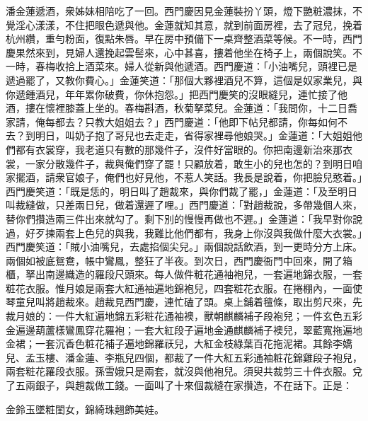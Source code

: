 潘金蓮遞酒，衆姊妹相陪吃了一回。西門慶因見金蓮裝扮丫頭，燈下艷粧濃抹，不覺淫心漾漾，不住把眼色遞與他。金蓮就知其意，就到前面房裡，去了冠兒，挽着杭州纘，重勻粉面，復點朱唇。早在房中預備下一桌齊整酒菜等候。不一時，西門慶果然來到，見婦人還挽起雲髻來，心中甚喜，摟着他坐在椅子上，兩個說笑。不一時，春梅收拾上酒菜來。婦人從新與他遞酒。西門慶道：「小油嘴兒，頭裡已是遞過罷了，又教你費心。」金蓮笑道：「那個大夥裡酒兒不算，這個是奴家業兒，與你遞鍾酒兒，年年累你破費，你休抱怨。」把西門慶笑的沒眼縫兒，連忙接了他酒，摟在懷裡膝蓋上坐的。春梅斟酒，秋菊拏菜兒。金蓮道：「我問你，十二日喬家請，俺每都去？只教大姐姐去？」西門慶道：「他即下帖兒都請，你每如何不去？到明日，叫奶子抱了哥兒也去走走，省得家裡尋他娘哭。」金蓮道：「大姐姐他們都有衣裳穿，我老道只有數的那幾件子，沒件好當眼的。你把南邊新治來那衣裳，一家分散幾件子，裁與俺們穿了罷！只顧放着，敢生小的兒也怎的？到明日咱家擺酒，請衆官娘子，俺們也好見他，不惹人笑話。我長是說着，你把臉兒憨着。」西門慶笑道：「既是恁的，明日叫了趙裁來，與你們裁了罷，」金蓮道：「及至明日叫裁縫做，只差兩日兒，做着還遲了哩。」西門慶道：「對趙裁說，多帶幾個人來，替你們攢造兩三件出來就勾了。剩下別的慢慢再做也不遲。」金蓮道：「我早對你說過，好歹揀兩套上色兒的與我，我難比他們都有，我身上你沒與我做什麼大衣裳。」西門慶笑道：「賊小油嘴兒，去處掐個尖兒。」兩個說話飲酒，到一更時分方上床。兩個如被底鴛鴦，帳中鸞鳳，整狂了半夜。到次日，西門慶衙門中回來，開了箱櫃，拏出南邊織造的羅段尺頭來。每人做件粧花通袖袍兒，一套遍地錦衣服，一套粧花衣服。惟月娘是兩套大紅通袖遍地錦袍兒，四套粧花衣服。在捲棚內，一面使琴童兒叫將趙裁來。趙裁見西門慶，連忙磕了頭。桌上鋪着氊條，取出剪尺來，先裁月娘的：一件大紅遍地錦五彩粧花通袖襖，獸朝麒麟補子段袍兒；一件玄色五彩金遍邊葫蘆樣鸞鳳穿花羅袍；一套大紅段子遍地金通麒麟補子襖兒，翠藍寬拖遍地金裙；一套沉香色粧花補子遍地錦羅祆兒，大紅金枝綠葉百花拖泥裙。其餘李嬌兒、孟玉樓、潘金蓮、李瓶兒四個，都裁了一件大紅五彩通袖粧花錦雞段子袍兒，兩套粧花羅段衣服。孫雪娥只是兩套，就沒與他袍兒。須臾共裁剪三十件衣服。兌了五兩銀子，與趙裁做工錢。一面叫了十來個裁縫在家攢造，不在話下。正是：

\begin{myquote}
金鈴玉墜粧閨女，錦綺珠翹飾美娃。
\end{myquote}

